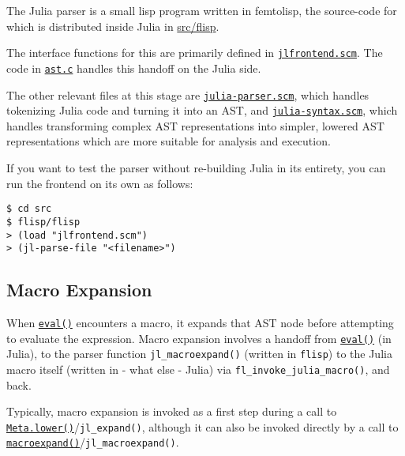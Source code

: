 The Julia parser is a small lisp program written in femtolisp, the source-code for which is distributed inside Julia in \href{https://github.com/JuliaLang/julia/tree/master/src/flisp}{src/flisp}.



The interface functions for this are primarily defined in \href{https://github.com/JuliaLang/julia/blob/master/src/jlfrontend.scm}{\texttt{jlfrontend.scm}}. The code in \href{https://github.com/JuliaLang/julia/blob/master/src/ast.c}{\texttt{ast.c}} handles this handoff on the Julia side.



The other relevant files at this stage are \href{https://github.com/JuliaLang/julia/blob/master/src/julia-parser.scm}{\texttt{julia-parser.scm}}, which handles tokenizing Julia code and turning it into an AST, and \href{https://github.com/JuliaLang/julia/blob/master/src/julia-syntax.scm}{\texttt{julia-syntax.scm}}, which handles transforming complex AST representations into simpler, {\textquotedbl}lowered{\textquotedbl} AST representations which are more suitable for analysis and execution.



If you want to test the parser without re-building Julia in its entirety, you can run the frontend on its own as follows:




\begin{lstlisting}
$ cd src
$ flisp/flisp
> (load "jlfrontend.scm")
> (jl-parse-file "<filename>")
\end{lstlisting}



\hypertarget{13925460440315781353}{}


\subsection{Macro Expansion}



When \hyperlink{7507639810592563424}{\texttt{eval()}} encounters a macro, it expands that AST node before attempting to evaluate the expression. Macro expansion involves a handoff from \hyperlink{7507639810592563424}{\texttt{eval()}} (in Julia), to the parser function \texttt{jl\_macroexpand()} (written in \texttt{flisp}) to the Julia macro itself (written in - what else - Julia) via \texttt{fl\_invoke\_julia\_macro()}, and back.



Typically, macro expansion is invoked as a first step during a call to \hyperlink{6644553029841096787}{\texttt{Meta.lower()}}/\texttt{jl\_expand()}, although it can also be invoked directly by a call to \hyperlink{8018172489611994488}{\texttt{macroexpand()}}/\texttt{jl\_macroexpand()}.



